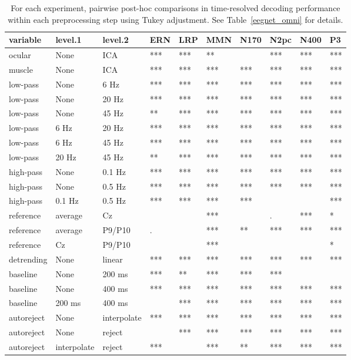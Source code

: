 \begin{table}[!htp]
\begin{widestuff}
\caption{For each experiment, pairwise post-hoc comparisons in time-resolved decoding performance within each preprocessing step using Tukey adjustment. See Table~\ref{eegnet_omni} for details.} 
\label{sliding_contrasts}
\begin{tabular}{llllllllll}
  \hline
variable & level.1 & level.2 & ERN & LRP & MMN & N170 & N2pc & N400 & P3 \\ 
  \hline
ocular & None & ICA & *** & *** & ** &   & *** & *** & *** \\ 
  muscle & None & ICA & *** & *** & *** & *** & *** & *** & *** \\ 
  low-pass & None & 6 Hz & *** & *** & *** & *** & *** & *** & *** \\ 
  low-pass & None & 20 Hz & *** & *** & *** & *** & *** & *** & *** \\ 
  low-pass & None & 45 Hz & ** & *** & *** & *** & *** & *** & *** \\ 
  low-pass & 6 Hz & 20 Hz & *** & *** & *** & *** & *** & *** & *** \\ 
  low-pass & 6 Hz & 45 Hz & *** & *** & *** & *** & *** & *** & *** \\ 
  low-pass & 20 Hz & 45 Hz & ** & *** & *** & *** & *** & *** & *** \\ 
  high-pass & None & 0.1 Hz & *** & *** & *** & *** & *** & *** & *** \\ 
  high-pass & None & 0.5 Hz & *** & *** & *** & *** & *** & *** & *** \\ 
  high-pass & 0.1 Hz & 0.5 Hz & *** & *** & *** & *** &   &   & *** \\ 
  reference & average & Cz &   &   & *** &   & . & *** & * \\ 
  reference & average & P9/P10 & . &   & *** & ** & *** & *** & *** \\ 
  reference & Cz & P9/P10 &   &   & *** &   &   &   & * \\ 
  detrending & None & linear & *** & *** & *** & *** & *** & *** & *** \\ 
  baseline & None & 200 ms & *** & ** & *** & *** & *** &   &   \\ 
  baseline & None & 400 ms & *** & *** & *** & *** & *** & *** & *** \\ 
  baseline & 200 ms & 400 ms &   & *** & *** & *** & *** & *** & *** \\ 
  autoreject & None & interpolate & *** & *** & *** & *** & *** & *** & *** \\ 
  autoreject & None & reject &   & *** & *** & *** & *** & *** & *** \\ 
  autoreject & interpolate & reject & *** &   & *** & ** & *** & *** & *** \\ 
   \hline
\end{tabular}
\end{widestuff}
\end{table}
